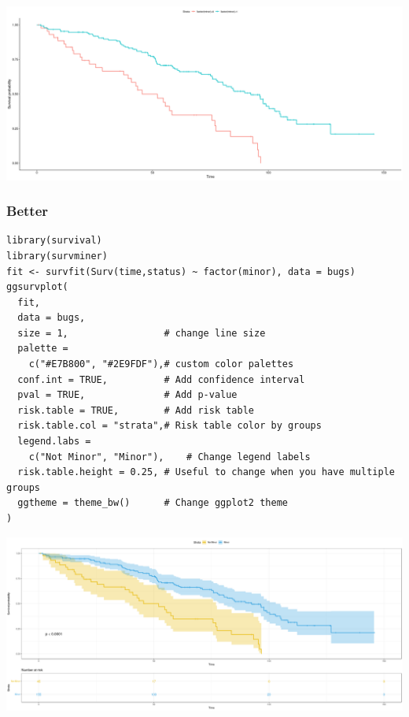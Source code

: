 \documentclass[11pt]{article}
\begin{document}
\begin{center}
\includegraphics[width=.9\linewidth]{SurvMinerRandBugsCox.png}
\end{center}
\subsubsection{Better}
\label{sec:orge24a2be}


\begin{verbatim}
library(survival)
library(survminer)
fit <- survfit(Surv(time,status) ~ factor(minor), data = bugs)
ggsurvplot(
  fit, 
  data = bugs, 
  size = 1,                 # change line size
  palette = 
    c("#E7B800", "#2E9FDF"),# custom color palettes
  conf.int = TRUE,          # Add confidence interval
  pval = TRUE,              # Add p-value
  risk.table = TRUE,        # Add risk table
  risk.table.col = "strata",# Risk table color by groups
  legend.labs = 
    c("Not Minor", "Minor"),    # Change legend labels
  risk.table.height = 0.25, # Useful to change when you have multiple groups
  ggtheme = theme_bw()      # Change ggplot2 theme
)
\end{verbatim}

\begin{center}
\includegraphics[width=.9\linewidth]{PrettySurvMinerRandBugsCox.png}
\end{center}
\end{document}
